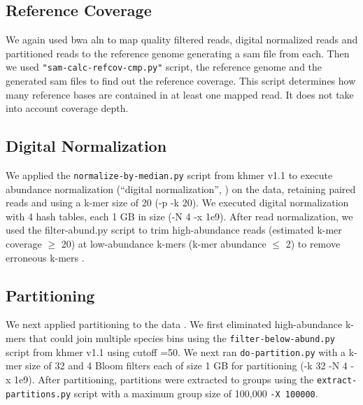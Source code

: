 \subsection*{Reference Coverage} 
We again used bwa aln to map quality filtered reads, digital normalized reads and
partitioned reads to the reference genome generating a sam file from
each. Then we used {\tt"sam-calc-refcov-cmp.py"} script, the reference
genome and the generated sam files to find out the reference
coverage. This script determines how many reference bases are contained in at least one mapped read. It does not take into account coverage depth. 


\subsection*{Digital Normalization} 

We applied the {\tt normalize-by-median.py} script from khmer v1.1 to
execute abundance normalization (``digital normalization'', \cite{brown2012})  on the data, retaining paired reads and using a
k-mer size of 20 (-p -k 20).  We executed digital normalization with 4
hash tables, each 1 GB in size (-N 4 -x 1e9).  After read
normalization, we used the filter-abund.py script to trim
high-abundance reads (estimated k-mer coverage $\geq$ 20) at low-abundance
k-mers (k-mer abundance $\leq$ 2)   %
to remove erroneous k-mers  \cite{qingpeng2014} \cite{streaming}. 


\subsection*{Partitioning} 

We next applied partitioning to the data \cite{jpell2012, ahowe2014}. %
We first eliminated high-abundance k-mers that could join multiple
species bins using the {\tt filter-below-abund.py} script from khmer v1.1 using cutoff =50. 
We next ran {\tt do-partition.py} with a k-mer size of 32 and 4 Bloom
filters each of size 1 GB for partitioning (-k 32 -N 4 -x 1e9).  After
partitioning, partitions were extracted to groups using the {\tt extract-partitions.py} script with a maximum group size of 100,000 {\tt -X 100000}.

